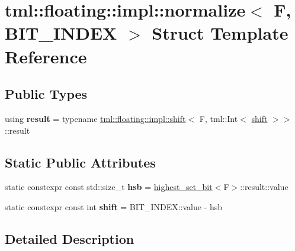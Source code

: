 \hypertarget{structtml_1_1floating_1_1impl_1_1normalize}{\section{tml\+:\+:floating\+:\+:impl\+:\+:normalize$<$ F, B\+I\+T\+\_\+\+I\+N\+D\+E\+X $>$ Struct Template Reference}
\label{structtml_1_1floating_1_1impl_1_1normalize}
}
\subsection*{Public Types}
\begin{DoxyCompactItemize}
\item 
\hypertarget{structtml_1_1floating_1_1impl_1_1normalize_ad893c56f1e4177ab640922a923d84d85}{using {\bfseries result} = typename \hyperlink{structtml_1_1floating_1_1impl_1_1shift}{tml\+::floating\+::impl\+::shift}$<$ F, tml\+::\+Int$<$ \hyperlink{structtml_1_1floating_1_1impl_1_1shift}{shift} $>$$>$\+::result}\label{structtml_1_1floating_1_1impl_1_1normalize_ad893c56f1e4177ab640922a923d84d85}

\end{DoxyCompactItemize}
\subsection*{Static Public Attributes}
\begin{DoxyCompactItemize}
\item 
\hypertarget{structtml_1_1floating_1_1impl_1_1normalize_a607fe6c9fb1c848de058f07b4c9cf7a8}{static constexpr const std\+::size\+\_\+t {\bfseries hsb} = \hyperlink{structtml_1_1floating_1_1impl_1_1highest__set__bit}{highest\+\_\+set\+\_\+bit}$<$F$>$\+::result\+::value}\label{structtml_1_1floating_1_1impl_1_1normalize_a607fe6c9fb1c848de058f07b4c9cf7a8}

\item 
\hypertarget{structtml_1_1floating_1_1impl_1_1normalize_ad88089a52f401399e72412da9b966322}{static constexpr const int {\bfseries shift} = B\+I\+T\+\_\+\+I\+N\+D\+E\+X\+::value -\/ hsb}\label{structtml_1_1floating_1_1impl_1_1normalize_ad88089a52f401399e72412da9b966322}

\end{DoxyCompactItemize}


\subsection{Detailed Description}
